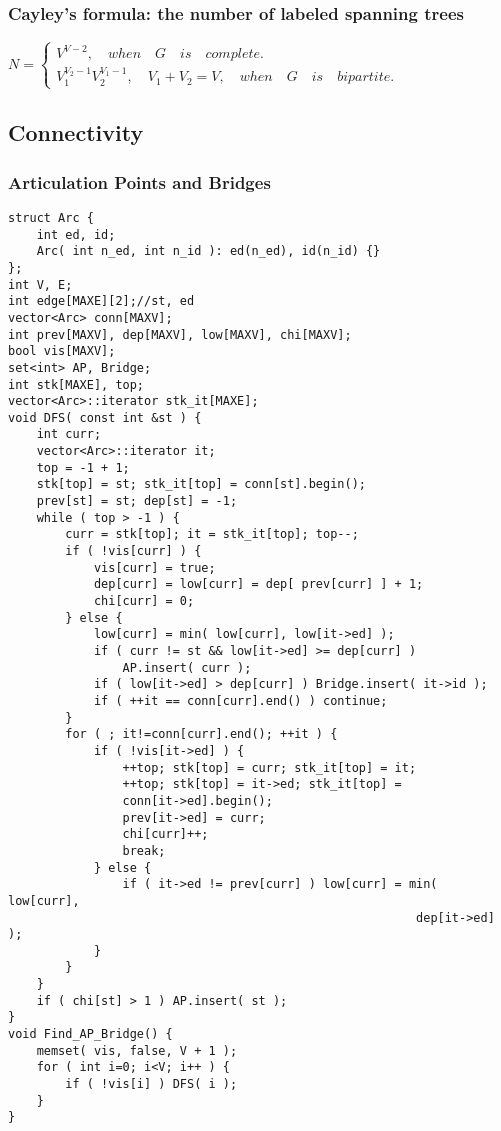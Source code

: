 \documentclass[10pt,twocolumn,oneside]{article}
\begin{document}
\subsubsection{Cayley's formula: the number of labeled spanning trees}
$N=\begin{cases} { V }^{ V-2 },\quad when\quad G\quad is\quad complete. \\ { V }_{ 1 }^{ { V }_{ 2 }-1 }{ V }_{ 2 }^{ { V }_{ 1 }-1 },{ \quad V }_{ 1 }+{ V }_{ 2 }=V,\quad when\quad G\quad is\quad bipartite. \end{cases}$
\subsection{Connectivity}
\subsubsection{Articulation Points and Bridges}
\begin{verbatim}
struct Arc {
    int ed, id;
    Arc( int n_ed, int n_id ): ed(n_ed), id(n_id) {}
};
int V, E;
int edge[MAXE][2];//st, ed
vector<Arc> conn[MAXV];
int prev[MAXV], dep[MAXV], low[MAXV], chi[MAXV];
bool vis[MAXV];
set<int> AP, Bridge;
int stk[MAXE], top;
vector<Arc>::iterator stk_it[MAXE];
void DFS( const int &st ) {
    int curr;
    vector<Arc>::iterator it;
    top = -1 + 1;
    stk[top] = st; stk_it[top] = conn[st].begin();
    prev[st] = st; dep[st] = -1;
    while ( top > -1 ) {
        curr = stk[top]; it = stk_it[top]; top--;
        if ( !vis[curr] ) {
            vis[curr] = true;
            dep[curr] = low[curr] = dep[ prev[curr] ] + 1;
            chi[curr] = 0;
        } else {
            low[curr] = min( low[curr], low[it->ed] );
            if ( curr != st && low[it->ed] >= dep[curr] )
                AP.insert( curr );
            if ( low[it->ed] > dep[curr] ) Bridge.insert( it->id );
            if ( ++it == conn[curr].end() ) continue;
        }
        for ( ; it!=conn[curr].end(); ++it ) {
            if ( !vis[it->ed] ) {
                ++top; stk[top] = curr; stk_it[top] = it;
                ++top; stk[top] = it->ed; stk_it[top] =
                conn[it->ed].begin();
                prev[it->ed] = curr;
                chi[curr]++;
                break;
            } else {
                if ( it->ed != prev[curr] ) low[curr] = min( low[curr],
                                                         dep[it->ed] );
            }
        }
    }
    if ( chi[st] > 1 ) AP.insert( st );
}
void Find_AP_Bridge() {
    memset( vis, false, V + 1 );
    for ( int i=0; i<V; i++ ) {
        if ( !vis[i] ) DFS( i );
    }
}
\end{verbatim}
\end{document}
